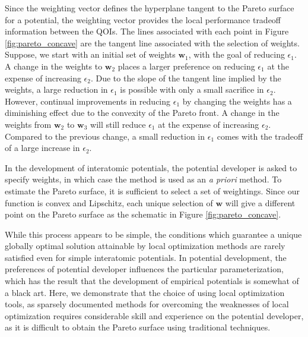 Since the weighting vector defines the hyperplane tangent to the Pareto surface for a potential, the weighting vector provides the local performance tradeoff information between the QOIs.  The lines associated with each point in Figure \ref{fig:pareto_concave} are the tangent line associated with the selection of weights.  Suppose, we start with an initial set of weights $\bm{w}_1$, with the goal of reducing $\epsilon_1$.  A change in the weights to $\bm{w}_2$ places a larger preference on reducing $\epsilon_1$ at the expense of increasing $\epsilon_2$.  Due to the slope of the tangent line implied by the weights, a large reduction in $\epsilon_1$ is possible with only a small sacrifice in $\epsilon_2$.  However, continual improvements in reducing $\epsilon_1$ by changing the weights has a diminishing effect due to the convexity of the Pareto front.  A change in the weights from $\bm{w}_2$ to $\bm{w}_3$ will still reduce $\epsilon_1$ at the expense of increasing $\epsilon_2$.  Compared to the previous change, a small reduction in $\epsilon_1$ comes with the tradeoff of a large increase in $\epsilon_2$.

In the development of interatomic potentials, the potential developer is asked to specify weights, in which case the method is used as an \emph{a priori} method.
To estimate the Pareto surface, it is sufficient to select a set of weightings.  Since our function is convex and Lipschitz, each unique selection of $\bm{w}$ will give a different point on the Pareto surface as the schematic in Figure \ref{fig:pareto_concave}.

While this process appears to be simple, the conditions which guarantee a unique globally optimal solution attainable by local optimization methods are rarely satisfied even for simple interatomic potentials.  In potential development, the preferences of potential developer influences the particular parameterization, which has the result that the development of empirical potentials is somewhat of a black art.  Here, we demonstrate that the choice of using local optimization tools, as sparsely documented methods for overcoming the weaknesses of local optimization requires considerable skill and experience on the potential developer, as it is difficult to obtain the Pareto surface using traditional techniques.

